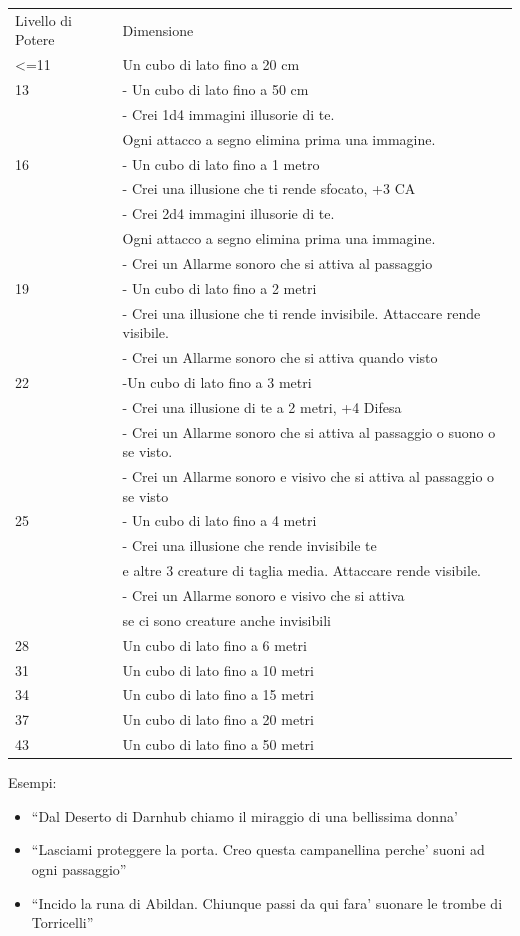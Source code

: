 \documentclass[a4paper,11pt,twoside,openany]{dndbook}
\begin{document}
\begin{tabular}[c]{@{}ll@{}}
\toprule 
Livello di Potere & Dimensione\tabularnewline
<=11 &Un cubo di lato fino a 20 cm\\
13 &- Un cubo di lato fino a 50 cm\\
&- Crei 1d4 immagini illusorie di te. \\
&Ogni attacco a segno elimina prima una immagine.\\
16& - Un cubo di lato fino a 1 metro \\
&- Crei una illusione che ti rende sfocato, +3 CA\\
&- Crei 2d4 immagini illusorie di te.\\
& Ogni attacco a segno elimina prima una immagine.\\
&- Crei un Allarme sonoro che si attiva al passaggio\\
19& - Un cubo di lato fino a 2 metri\\
&- Crei una illusione che ti rende invisibile. Attaccare rende visibile.\\
&- Crei un Allarme sonoro che si attiva quando visto\\
22& -Un cubo di lato fino a 3 metri\\
& - Crei una illusione di te a 2 metri, +4 Difesa\\
& - Crei un Allarme sonoro che si attiva al passaggio o suono o se visto.\\
& - Crei un Allarme sonoro e visivo che si attiva al passaggio o se visto\\
25 &- Un cubo di lato fino a 4 metri\\
&- Crei una illusione che rende invisibile te \\
&e altre 3 creature di taglia media. Attaccare rende visibile.\\
&- Crei un Allarme sonoro e visivo che si attiva \\
&se ci sono creature anche invisibili\\
28 & Un cubo di lato fino a 6 metri\tabularnewline
31 & Un cubo di lato fino a 10 metri\tabularnewline
34 & Un cubo di lato fino a 15 metri\tabularnewline
37 & Un cubo di lato fino a 20 metri\tabularnewline
43 & Un cubo di lato fino a 50 metri\tabularnewline
\bottomrule
\end{tabular}

\bigskip

Esempi:
\begin{itemize}
\item 
``Dal Deserto di Darnhub chiamo il miraggio di una bellissima donna' 
\item 
``Lasciami proteggere la porta. Creo questa campanellina perche' suoni ad ogni passaggio'' 
\item 
``Incido la runa di Abildan. Chiunque passi da qui fara' suonare le trombe di Torricelli'' 
\end{itemize}
\end{document}
